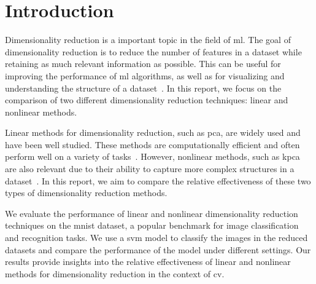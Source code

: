 \chapter{Introduction}\label{cha:introduction}




Dimensionality reduction is a important topic in the field of \gls{ml}. The goal of dimensionality reduction is to reduce the number of features in a dataset while retaining as much relevant information as possible. This can be useful for improving the performance of \gls{ml} algorithms, as well as for visualizing and understanding the structure of a dataset~\cite{dimensionality-reduction-cheng}. In this report, we focus on the comparison of two different dimensionality reduction techniques: linear and nonlinear methods.

Linear methods for dimensionality reduction, such as \gls{pca}, are widely used and have been well studied. These methods are computationally efficient and often perform well on a variety of tasks~\cite{james-statistical-learning1}. However, nonlinear methods, such as \gls{kpca} are also relevant due to  their ability to capture more complex structures in a dataset~\cite{dimensionality-reduction-cheng}. In this report, we aim to compare the relative effectiveness of these two types of dimensionality reduction methods.

We evaluate the performance of linear and nonlinear dimensionality reduction techniques on the \gls{mnist} dataset, a popular benchmark for image classification and recognition tasks. We use a \gls{svm} model to classify the images in the reduced datasets and compare the performance of the model under different settings. Our results provide insights into the relative effectiveness of linear and nonlinear methods for dimensionality reduction in the context of \gls{cv}.

